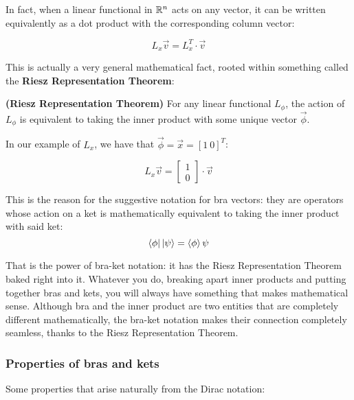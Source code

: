 In fact, when a linear functional in $\mathbb{R}^n$ acts on any vector, it can be written equivalently as a dot product with the corresponding column vector:

\begin{equation}
    L_x \vec{v} = L_x^T\cdot \vec{v}
\end{equation}

This is actually a very general mathematical fact, rooted within something called the \textbf{Riesz Representation Theorem}:

\begin{theorem}
    \textbf{(Riesz Representation Theorem)} For any linear functional $L_\phi$, the action of $L_\phi$ is equivalent to taking the inner product with some unique vector $\vec{\phi}$.
\end{theorem}

In our example of $L_x$, we have that $\vec{\phi} = \vec{x} = [1\ 0]^T$:

\begin{equation}
    L_x\vec{v} = \begin{bmatrix}
        1 \\ 0
    \end{bmatrix}\cdot \vec{v}    
\end{equation}

This is the reason for the suggestive notation for bra vectors: they are operators whose action on a ket is mathematically equivalent to taking the inner product with said ket:
\begin{equation}
    \bra{\phi}\ket{\psi} = \braket{\phi}{\psi}
\end{equation}

That is the power of bra-ket notation: it has the Riesz Representation Theorem baked right into it. Whatever you do, breaking apart inner products and putting together bras and kets, you will always have something that makes mathematical sense. Although bra and the inner product are two entities that are completely different mathematically, the bra-ket notation makes their connection completely seamless, thanks to the Riesz Representation Theorem.


\subsubsection{Properties of bras and kets}

Some properties that arise naturally from the Dirac notation:

